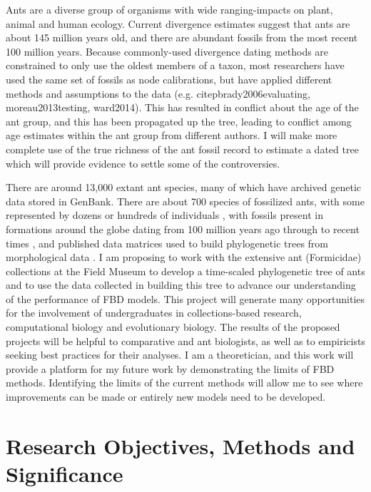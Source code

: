 \documentclass[]{article}
\begin{document}
Ants are a diverse group of organisms with wide ranging-impacts on plant, animal and human ecology. Current divergence estimates suggest that ants are about 145 million years old, and there are abundant fossils from the most recent 100 million years. Because commonly-used divergence dating methods are constrained to only use the oldest members of a taxon, most researchers have used the same set of fossils as node calibrations, but have applied different methods and assumptions to the data (e.g. citep{brady2006evaluating, moreau2013testing, ward2014}). This has resulted in conflict about the age of the ant group, and this has been propagated up the tree, leading to conflict among age estimates within the ant group from different authors. I will make more complete use of the true richness of the ant fossil record to estimate a dated tree which will provide evidence to settle some of the controversies. \par
There are around 13,000 extant ant species, many of which have archived genetic data stored in GenBank. There are about 700 species of fossilized ants, with some represented by dozens or hundreds of individuals \citep{ref87}, with fossils present in formations around the globe dating from 100 million years ago through to recent times \citep{ref87}, and published data matrices used to build phylogenetic trees from morphological data \citep{urbani1992internal, grimaldi1997new, brady2005morphological}. I am proposing to work with the extensive ant (Formicidae) collections at the Field Museum to develop a time-scaled phylogenetic tree of ants and to use the data collected in building this tree to advance our understanding of the performance of FBD models. This project will generate many opportunities for the involvement of undergraduates in collections-based research, computational biology and evolutionary biology. The results of the proposed projects will be helpful to comparative and ant biologists, as well as to empiricists seeking best practices for their analyses. I am a theoretician, and this work will provide a platform for my future work by demonstrating the limits of FBD methods. Identifying the limits of the current methods will allow me to see where improvements can be made or entirely new models need to be developed. \par


\section*{Research Objectives, Methods and Significance}
\end{document}
